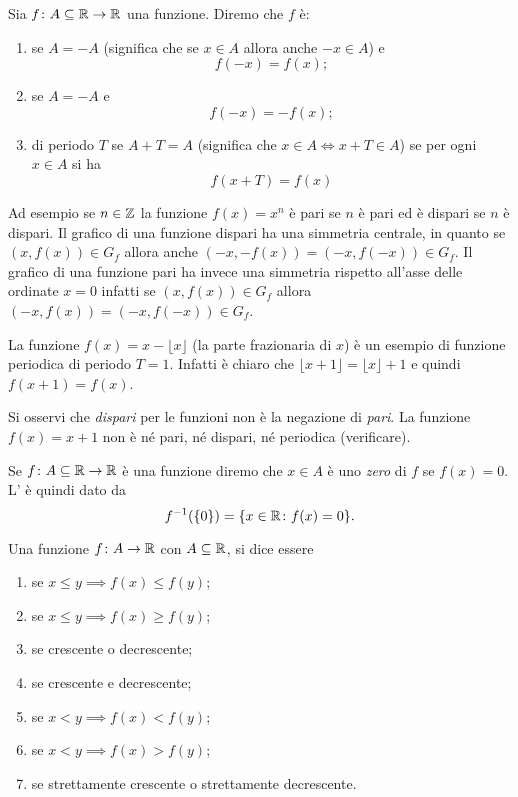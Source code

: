 \begin{definition}[simmetrie]
Sia $f\colon A \subseteq \mathbb R \to \mathbb R$ una funzione.
Diremo che $f$ è:
\begin{enumerate}
\item {}
%
se $A=-A$ (significa che se $x\in A$ allora anche $-x\in A$) e
\[
  f(-x) = f(x);
\]
\item {}
%
se $A=-A$ e
\[
  f(-x) = -f(x);
\]
\item {}
%
di periodo $T$ se $A+T=A$
(significa che $x\in A \iff x+T \in A$)
se per ogni $x\in A$ si ha
\[
  f(x+T)=f(x)
\]
\end{enumerate}
\end{definition}

Ad esempio se $n\in \mathbb Z$ la funzione $f(x)=x^n$
è pari se $n$ è pari ed è dispari se $n$ è dispari.
Il grafico di una funzione dispari ha una simmetria
centrale, in quanto se $(x,f(x))\in G_f$ allora
anche $(-x,-f(x)) = (-x,f(-x))\in G_f$.
Il grafico di una funzione pari ha invece una
simmetria rispetto all'asse delle ordinate $x=0$
infatti se $(x,f(x))\in G_f$ allora $(-x,f(x)) = (-x,f(-x)) \in G_f$.

La funzione $f(x) = x - \lfloor x\rfloor$ (la parte frazionaria di $x$)
è un esempio di funzione periodica di periodo $T=1$. Infatti
è chiaro che $\lfloor x+1\rfloor = \lfloor x \rfloor +1$ e quindi
$f(x+1)=f(x)$.

Si osservi che \emph{dispari} per le funzioni non è la negazione
di \emph{pari}.
La funzione $f(x) = x+1$ non è né pari, né dispari, né periodica
(verificare).

\begin{definition}[zeri]
  Se $f\colon A\subseteq \mathbb R \to \mathbb R$ è una funzione diremo che
  $x\in A$ è uno \emph{zero} di $f$ se $f(x)=0$.
  L'
  è quindi dato da
  \[
    f^{-1}({\left\{ 0 \right\}}) = {\left\{ x\in \mathbb R\colon f(x) = 0 \right\}}.
  \]
\end{definition}

\begin{definition}
\label{def:monotonia}%
\mymark{***}%
%
%
%
Una funzione $f\colon A \to \mathbb R$ con $A\subseteq \mathbb R$, si
dice essere
\begin{enumerate}
\item {} se $x \le y \implies f(x) \le f(y)$;
\item {} se $x \le y \implies f(x) \ge f(y)$;
\item {} se crescente o decrescente;
\item {} se crescente e decrescente;
\item {} se $x<y \implies f(x) < f(y)$;
\item {} se $x<y \implies f(x) > f(y)$;
\item {} se strettamente crescente o strettamente decrescente.
\end{enumerate}
\end{definition}

